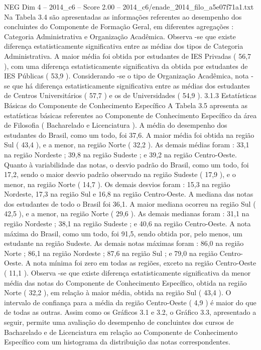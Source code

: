 \begin{textsample}{NEG Dim 4 – 2014\_c6 – Score 2.00 – 2014\_c6/enade\_2014\_filo\_a5e07f71a1.txt}
Na Tabela 3.4 são apresentadas as informações referentes ao desempenho dos concluintes do Componente de Formação Geral, em diferentes agregações : Categoria Administrativa e Organização Acadêmica.
Observa -se que existe diferença estatisticamente significativa entre as médias dos tipos de Categoria Administrativa.
A maior média foi obtida por estudantes de IES Privadas ( 56,7 ), com uma diferença estatisticamente significativa da obtida por estudantes de IES Públicas ( 53,9 ).
Considerando -se o tipo de Organização Acadêmica, nota -se que há diferença estatisticamente significativa entre as médias dos estudantes de Centros Universitários ( 57,7 ) e os de Universidades ( 54,9 ). 3.1.3 Estatísticas Básicas do Componente de Conhecimento Específico A Tabela 3.5 apresenta as estatísticas básicas referentes ao Componente de Conhecimento Específico da área de Filosofia ( Bacharelado e Licenciatura ).
A média do desempenho dos estudantes do Brasil, como um todo, foi 37,6.
A maior média foi obtida na região Sul ( 43,4 ), e a menor, na região Norte ( 32,2 ).
As demais médias foram : 33,1 na região Nordeste ; 39,8 na região Sudeste ; e 39,2 na região Centro-Oeste.
Quanto à variabilidade das notas, o desvio padrão do Brasil, como um todo, foi 17,2, sendo o maior desvio padrão observado na região Sudeste ( 17,9 ), e o menor, na região Norte ( 14,7 ).
Os demais desvios foram : 15,3 na região Nordeste, 17,3 na região Sul e 16,8 na região Centro-Oeste.
A mediana das notas dos estudantes de todo o Brasil foi 36,1.
A maior mediana ocorreu na região Sul ( 42,5 ), e a menor, na região Norte ( 29,6 ).
As demais medianas foram : 31,1 na região Nordeste ; 38,1 na região Sudeste ; e 40,6 na região Centro-Oeste.
A nota máxima do Brasil, como um todo, foi 91,5, sendo obtida por, pelo menos, um estudante na região Sudeste.
As demais notas máximas foram : 86,0 na região Norte ; 86,1 na região Nordeste ; 87,6 na região Sul ; e 79,0 na região Centro-Oeste.
A nota mínima foi zero em todas as regiões, exceto na região Centro-Oeste ( 11,1 ).
Observa -se que existe diferença estatisticamente significativa da menor média das notas do Componente de Conhecimento Específico, obtida na região Norte ( 32,2 ), em relação à maior média, obtida na região Sul ( 43,4 ).
O intervalo de confiança para a média da região Centro-Oeste ( 4,9 ) é maior do que de todas as outras.
Assim como os Gráficos 3.1 e 3.2, o Gráfico 3.3, apresentado a seguir, permite uma avaliação do desempenho de concluintes dos cursos de Bacharelado e de Licenciatura em relação ao Componente de Conhecimento Específico com um histograma da distribuição das notas correspondentes.

\end{textsample}
